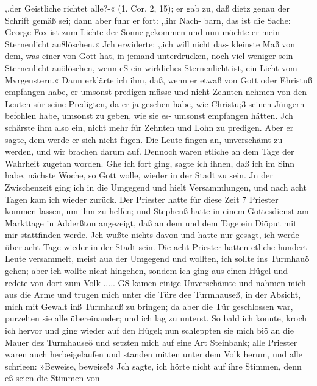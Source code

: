 ,,der Geistliche richtet alle?-« (1. Cor. 2, 15); er gab zu, daß dietz
genau der Schrift gemäß sei; dann aber fuhr er fort: ,,ihr Nach-
barn, das ist die Sache: George Fox ist zum Lichte der Sonne
gekommen und nun möchte er mein Sternenlicht au8löschen.« Jch
erwiderte: ,,ich will nicht das- kleinste Maß von dem, was einer
von Gott hat, in jemand unterdrücken, noch viel weniger sein
Sternenlicht auölöschen, wenn eS ein wirkliches Sternenlicht ist,
ein Licht vom Mvrgenstern.« Dann erklärte ich ihm, daß, wenn
er etwaß von Gott oder Ehristuß empfangen habe, er umsonst
predigen müsse und nicht Zehnten nehmen von den Leuten sür
seine Predigten, da er ja gesehen habe, wie Christu;3 seinen
Jüngern befohlen habe, umsonst zu geben, wie sie es- umsonst
empfangen hätten. Jch schärste ihm also ein, nicht mehr für
Zehnten und Lohn zu predigen. Aber er sagte, dem werde er
sich nicht fügen. Die Leute fingen an, unverschämt zu werden,
und wir brachen darum auf. Dennoch waren etliche an dem
Tage der Wahrheit zugetan worden. Ghe ich fort ging, sagte
ich ihnen, daß ich im Sinn habe, nächste Woche, so Gott wolle,
wieder in der Stadt zu sein. Jn der Zwischenzeit ging ich in
die Umgegend und hielt Versammlungen, und nach acht Tagen
kam ich wieder zurück. Der Priester hatte für diese Zeit 7 Priester
kommen lassen, um ihm zu helfen; und Stephenß hatte in einem
Gottesdienst am Markttage in Adderßton angezeigt, daß an dem
und dem Tage ein Diöput mit mir stattfinden werde. Jch wußte
nichts davon und hatte nur gesagt, ich werde über acht Tage
wieder in der Stadt sein. Die acht Priester hatten etliche hundert
Leute versammelt, meist aua der Umgegend und wollten, ich sollte
ins Turmhauö gehen; aber ich wollte nicht hingehen, sondem
ich ging aus einen Hügel und redete von dort zum Volk .....
GS kamen einige Unverschämte und nahmen mich aus die
Arme und trugen mich unter die Türe dee Turmhauseß, in der
Absicht, mich mit Gewalt inß Turmhauß zu bringen; da aber
die Tür geschlossen war, purzelten sie alle übereinander; und ich
lag zu unterst. So bald ich konnte, kroch ich hervor und ging wieder
auf den Hügel; nun schleppten sie mich biö an die Mauer
dez Turmhauseö und setzten mich auf eine Art Steinbank; alle
Priester waren auch herbeigelaufen und standen mitten unter dem
Volk herum, und alle schrieen: »Beweise, beweise!« Jch sagte,
ich hörte nicht auf ihre Stimmen, denn eß seien die Stimmen von


